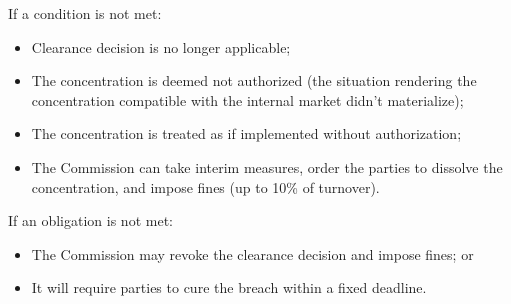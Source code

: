     If a condition is not met:
    \begin{itemize}
        \item Clearance decision is no longer applicable;
        \item The concentration is deemed not authorized (the situation rendering the concentration compatible with the internal market didn’t materialize);
        \item The concentration is treated as if implemented without authorization;
        \item The Commission can take interim measures, order the parties to dissolve the concentration, and impose fines (up to 10\% of turnover).
    \end{itemize}
    
    If an obligation is not met:
    \begin{itemize}
        \item The Commission may revoke the clearance decision and impose fines; or
        \item It will require parties to cure the breach within a fixed deadline.
    \end{itemize}

    